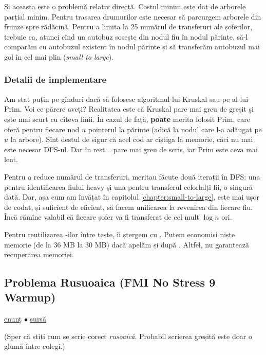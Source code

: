 \documentclass[../main.tex]{subfiles}
\begin{document}
Și aceasta este o problemă relativ directă. Costul minim este dat de arborele parțial minim. Pentru trasarea drumurilor este necesar să parcurgem arborele din frunze spre rădăcină. Pentru a limita la 25 numărul de transferuri ale șoferilor, trebuie ca, atunci cînd un autobuz sosește din nodul fiu în nodul părinte, să-l comparăm cu autobuzul existent în nodul părinte și să transferăm autobuzul mai gol în cel mai plin (\textit{small to large}).

\subsubsection*{Detalii de implementare}

Am stat puțin pe gînduri dacă să folosesc algoritmul lui Kruskal sau pe al lui Prim. Voi ce părere aveți? Realitatea este că Kruskal pare mai greu de greșit și este mai scurt cu cîteva linii. În cazul de față, \textbf{poate} merita folosit Prim, care oferă pentru fiecare nod $u$ pointerul la părinte (adică la nodul care l-a adăugat pe $u$ la arbore). Sînt destul de sigur că acel cod ar cîștiga la memorie, căci nu mai este necesar DFS-ul. Dar în rest... pare mai greu de scris, iar Prim este ceva mai lent.

Pentru a reduce numărul de transferuri, meritau făcute două iterații în DFS: una pentru identificarea fiului heavy și una pentru transferul celorlalți fii, o singură dată. Dar, așa cum am învățat în capitolul \ref{chapter:small-to-large}, este mai ușor de codat, și suficient de eficient, să facem unificarea la revenirea din fiecare fiu. Încă rămîne valabil că fiecare șofer va fi transferat de cel mult $\log n$ ori.

Pentru reutilizarea -ilor între teste, îi ștergem cu . Putem economisi niște memorie (de la 36 MB la 30 MB) dacă apelăm și  după . Altfel,  nu garantează recuperarea memoriei.

\subsection{Problema Rusuoaica (FMI No Stress 9 Warmup)}
\label{problem:rusuoaica}

\href{https://infoarena.ro/problema/rusuoaica}{enunț}
$\bullet$
\hyperref[code:rusuoaica]{sursă}

(Sper că știți cum se scrie corect \textit{rusoaică}. Probabil scrierea greșită este doar o glumă între colegi.)
\end{document}
